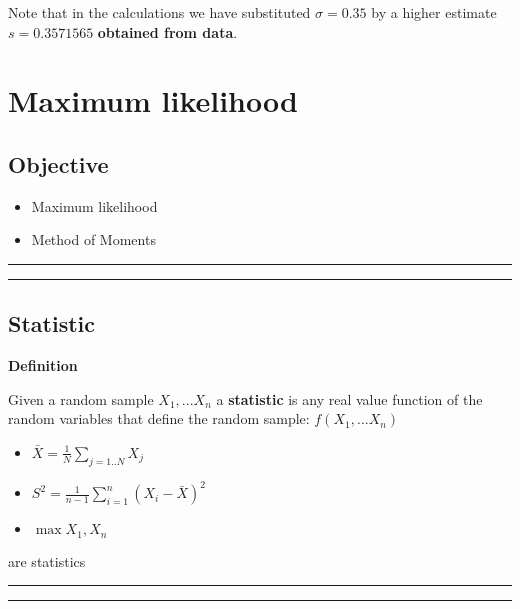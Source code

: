\documentclass[
]{book}
\providecommand{\tightlist}{%
  \setlength{\itemsep}{0pt}\setlength{\parskip}{0pt}}
\begin{document}
Note that in the calculations we have substituted \(\sigma=0.35\) by a higher estimate \(s=0.3571565\) \textbf{obtained from data}.

\hypertarget{maximum-likelihood}{%
\chapter{Maximum likelihood}\label{maximum-likelihood}}

\hypertarget{objective-11}{%
\section{Objective}\label{objective-11}}

\begin{itemize}
\tightlist
\item
  Maximum likelihood
\item
  Method of Moments
\end{itemize}

\begin{center}\rule{0.5\linewidth}{0.5pt}\end{center}

\begin{center}\rule{0.5\linewidth}{0.5pt}\end{center}

\hypertarget{statistic-1}{%
\section{Statistic}\label{statistic-1}}

\textbf{Definition}

Given a random sample \(X_1,...X_n\) a \textbf{statistic} is any real value function of the random variables that define the random sample: \(f(X_1,...X_n)\)

\begin{itemize}
\tightlist
\item
  \(\bar{X}=\frac{1}{N} \sum_{j=1..N} X_j\)
\item
  \(S^2=\frac{1}{n-1}\sum_{i=1}^n (X_i-\bar{X})^2\)
\item
  \(\max{X_1, X_n}\)
\end{itemize}

are statistics

\begin{center}\rule{0.5\linewidth}{0.5pt}\end{center}

\begin{center}\rule{0.5\linewidth}{0.5pt}\end{center}
\end{document}
